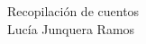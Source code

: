 \begin{titlepage}
  \vspace*{1cm}
  \begin{center}
    {\Huge Recopilación de cuentos\\[0.5cm]}
    {\large Lucía Junquera Ramos}
  \end{center}
\end{titlepage}
